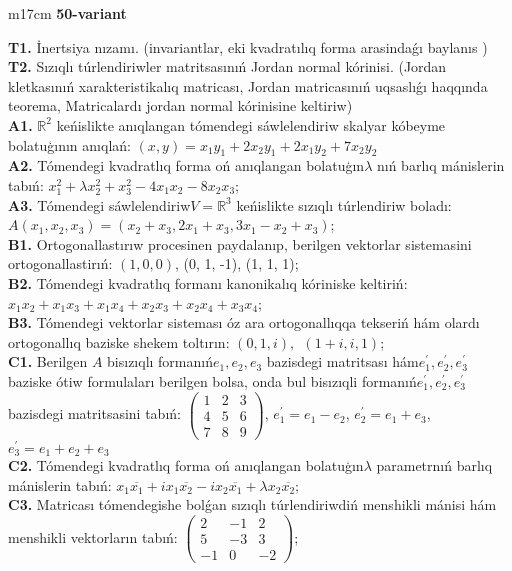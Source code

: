 \documentclass{article}
\begin{document}
\begin{tabular}{m{17cm}}
\textbf{50-variant}
\newline

\textbf{T1.} İnertsiya nızamı. (invariantlar,  eki kvadratılıq forma arasindaǵı baylanıs ) \\
\textbf{T2.} Sızıqlı túrlendiriwler matritsasınıń Jordan normal kórinisi. (Jordan kletkasınıń xarakteristikalıq matricası, Jordan matricasınıń uqsaslıǵı haqqında teorema,  Matricalardı jordan normal kórinisine keltiriw) \\
\textbf{A1.} \(\mathbb{R}^{2}\) keńislikte anıqlangan tómendegi sáwlelendiriw skalyar kóbeyme bolatuģının anıqlań: \((x,y) = x_{1}y_{1} + 2x_{2}y_{1} + 2x_{1}y_{2} + 7x_{2}y_{2}\) \\
\textbf{A2.} Tómendegi kvadratlıq forma oń anıqlangan bolatuģın\(\lambda\) nıń barlıq mánislerin tabıń: \(x_{1}^{2} + \lambda x_{2}^{2} + x_{3}^{2} - 4x_{1}x_{2} - 8x_{2}x_{3}\); \\
\textbf{A3.} Tómendegi sáwlelendiriw\(V = \mathbb{R}^{3}\) keńislikte sızıqlı túrlendiriw boladı: \(A\left( x_{1},x_{2},x_{3} \right) = \left( x_{2} + x_{3},2x_{1} + x_{3},3x_{1} - x_{2} + x_{3} \right)\); \\
\textbf{B1.} Ortogonallastırıw procesinen paydalanıp, berilgen vektorlar sistemasini ortogonallastirıń: \((1,0,0)\), (0, 1, -1), (1, 1, 1); \\
\textbf{B2.} Tómendegi kvadratlıq formanı kanonikalıq kóriniske keltiriń: \(x_{1}x_{2} + x_{1}x_{3} + x_{1}x_{4} + x_{2}x_{3} + x_{2}x_{4} + x_{3}x_{4}\); \\
\textbf{B3.} Tómendegi vektorlar sisteması óz ara ortogonallıqqa tekseriń hám olardı ortogonallıq baziske shekem toltırın: \((0,1,i),\ \ (1 + i,i,1)\); \\
\textbf{C1.} Berilgen \(A\) bisızıqlı formanıń\(e_{1},e_{2},e_{3}\) bazisdegi matritsası hám\(e_{1}^{'},e_{2}^{'},e_{3}^{'}\) baziske ótiw formulaları berilgen bolsa, onda bul bisızıqli formanıń\(e_{1}^{'},e_{2}^{'},e_{3}^{'}\) bazisdegi matritsasini tabıń: \(\begin{pmatrix} 1 & 2 & 3 \\ 4 & 5 & 6 \\ 7 & 8 & 9 \end{pmatrix}\), \(e_{1}^{'} = e_{1} - e_{2}\), \(e_{2}^{'} = e_{1} + e_{3}\), \(e_{3}^{'} = e_{1} + e_{2} + e_{3}\) \\
\textbf{C2.} Tómendegi kvadratlıq forma oń anıqlangan bolatuģın\(\lambda\) parametrnıń barlıq mánislerin tabıń: \(x_{1}\overline{x_{1}} + ix_{1}\overline{x_{2}} - ix_{2}\overline{x_{1}} + \lambda x_{2}\overline{x_{2}}\); \\
\textbf{C3.} Matricası tómendegishe bolǵan sızıqlı túrlendiriwdiń menshikli mánisi hám menshikli vektorların tabıń: \(\begin{pmatrix} 2 & - 1 & 2 \\ 5 & - 3 & 3 \\  - 1 & 0 & - 2 \end{pmatrix}\); \\

\end{tabular}
\vspace{1cm}
\end{document}
